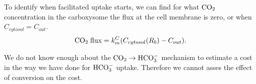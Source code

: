 \documentclass[]{article}
\begin{document}
To identify when facilitated uptake starts, we can find for what ${\rm CO_2}$ concentration in the carboxysome the flux at the cell membrane is zero, or when  $C_{cytosol}= C_{out}$. 
\begin{equation}
{\rm CO_2 \; flux} = k_m^C(C_{cytosol}(R_b)-C_{out}).
\end{equation}

We do not know enough about the ${\rm CO_2 \rightarrow HCO_3^-}$ mechanism to estimate a cost in the way we have done for ${\rm HCO_3^-}$ uptake. Therefore we cannot asses the effect of conversion on the cost.

\end{document}
